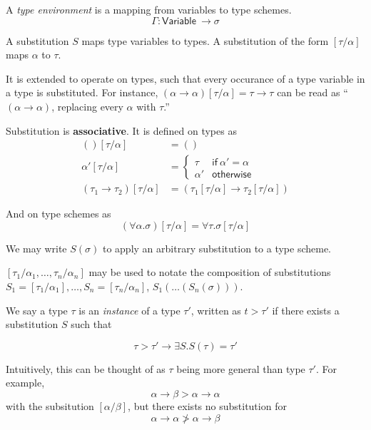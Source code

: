 A \textit{type environment} is a mapping from variables to type schemes. 
\[\Gamma : \mathsf{Variable} \ \rightarrow \sigma\]

A substitution $S$ maps type variables to types. A substitution of the
form $[\tau/\alpha]$ maps $\alpha$ to $\tau$.

It is extended to operate on types, such that every occurance of a
type variable in a type is substituted.
For instance, $(\alpha \rightarrow \alpha)[\tau/\alpha] = \tau \rightarrow \tau$ can be read as ``$(\alpha \rightarrow \alpha)$,
replacing every $\alpha$ with $\tau$.''

  Substitution is \textbf{associative}. It is defined on types as
  \begin{align*}
    () [\tau/\alpha] &= () \\
    \alpha' [\tau/\alpha] &=
                            \begin{cases}
                              \tau & \mathsf{if} \ \alpha' = \alpha \\
                              \alpha' & \mathsf{otherwise}
                            \end{cases} \\
    (\tau_1 \rightarrow \tau_2)[\tau/\alpha] &= (\tau_1[\tau/\alpha] \rightarrow \tau_2[\tau/\alpha])
  \end{align*}

And on type schemes as
\[(\forall \alpha . \sigma)[\tau/\alpha] = \forall \tau . \sigma[\tau/\alpha]\]

We may write $S(\sigma)$ to apply an arbitrary substitution to a type
scheme.

$[\tau_1/\alpha_1, \ldots, \tau_n/\alpha_n]$ may be used to notate the composition of
substitutions $S_1 = [\tau_1/\alpha_1], \ldots, S_n = [\tau_n/\alpha_n]$, $S_1(\ldots(S_n(\sigma)))$.

We say a type $\tau$ is an \textit{instance} of a type $\tau'$,
written as $t > \tau'$ if there exists a substitution $S$ such that

\[ \tau > \tau' \rightarrow \exists S. S(\tau) = \tau' \]

Intuitively, this can be thought of as $\tau$ being more general than
type $\tau'$. For example,
\[ \alpha \rightarrow \beta > \alpha \rightarrow \alpha \]
with the subsitution $[\alpha/\beta]$, but there exists no substitution for
\[ \alpha \rightarrow \alpha \ngtr \alpha \rightarrow \beta \]

